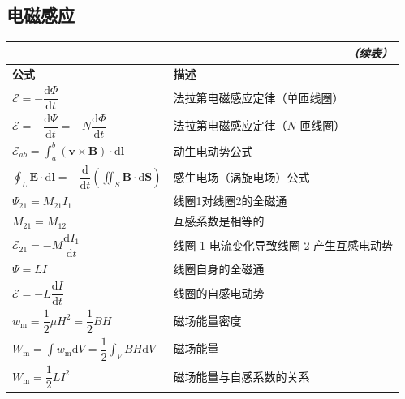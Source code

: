 \documentclass[UTF8]{ctexart}
\newcommand\Emph[1]{\colorbox{green!10}{\textcolor{green!30!black}{#1}}}
\newcommand\Example[1]{\textcolor{cyan!70!black}{\small #1}}
\renewcommand\d{\mathrm{d}}
\newcommand\B{\boldsymbol{B}}
\renewcommand\S{\boldsymbol{S}}
\renewcommand\l{\boldsymbol{l}}
\newcommand\dds{\mathcal{E}} %
\begin{document}
\subsection{电磁感应}
\begin{longtable}{|p{}|p{}|}
    \multicolumn{2}{r}{\textit{（续表）}} \\
    \hline
\endhead
    \hline
\endfirsthead
\endfoot
    \hline
\endlastfoot

    \textbf{公式} & \textbf{描述} \\
    \hline
    \Emph{$\dds = -\dfrac{\d\varPhi}{\d t}$} & 法拉第电磁感应定律\Example{（单匝线圈）} \\
    \hline
    $\dds = -\dfrac{\d\varPsi}{\d t} = -N\dfrac{\d\varPhi}{\d t}$ & 法拉第电磁感应定律\Example{（$N$ 匝线圈）} \\
    \hline
    \Emph{$\displaystyle \dds_{ab} = \int_a^b (\boldsymbol{v}\times\B)\cdot \d\l$} & 动生电动势公式 \\
    \hline
    $\displaystyle\oint_L \boldsymbol{E}\cdot\d\l = -\dfrac{\d}{\d t}\left(\iint_S \B\cdot \d\S\right)$ & 感生电场（涡旋电场）公式 \\
    \hline
    $\varPsi_{21} = M_{21} I_1$ & 线圈1对线圈2的全磁通 \\
    \hline
    $M_{21} = M_{12}$ & 互感系数是相等的 \\
    \hline
    $\dds_{21} = -M\dfrac{\d I_1}{\d t}$ & 线圈 1 电流变化导致线圈 2 产生互感电动势 \\
    \hline
    $\varPsi = LI$ & 线圈自身的全磁通 \\
    \hline
    $\dds = -L\dfrac{\d I}{\d t}$ & 线圈的自感电动势 \\
    \hline
    \Emph{$w_{\mathrm{m}}  = \dfrac12 \mu H^2 = \dfrac12 BH$} & 磁场能量密度 \\
    \hline
    $\displaystyle W_{\mathrm{m}} = \int w_{\mathrm{m}}\d V = \dfrac12 \int _V BH\d V$ & 磁场能量 \\
    \hline
    $W_\mathrm{m} = \dfrac12 LI^2$ & 磁场能量与自感系数的关系 \\
\end{longtable}
\end{document}
